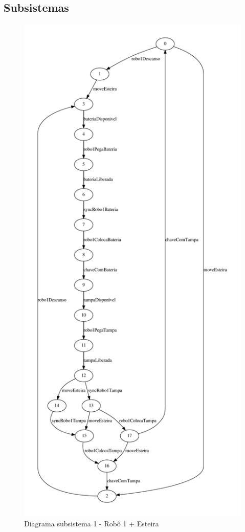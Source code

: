 \documentclass[a4paper,11pt,twocolumns]{article}
\begin{document}
\subsection{Subsistemas}
\begin{figure}[H]
    \centering
    \includegraphics[height = 0.9\textheight]{./img/g_sistema1.pdf}
    \caption{Diagrama subsistema 1 - Robô 1 + Esteira}
    \label{fig:g_subsis1}
\end{figure}
\end{document}
